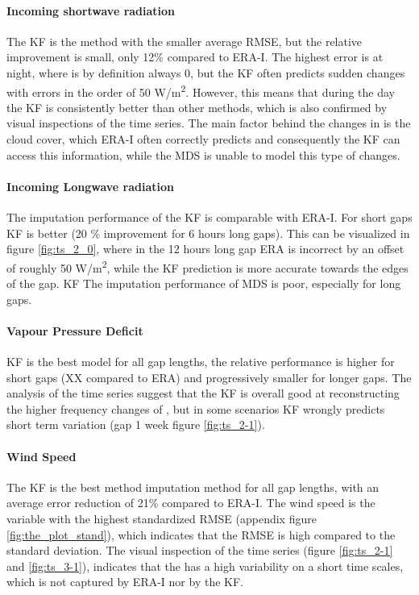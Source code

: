 \documentclass{article}
\begin{document}
\paragraph{Incoming shortwave radiation} The KF is the method with the smaller average RMSE, but the relative improvement is small, only 12\% compared to ERA-I. The highest error is at night, where  is by definition always 0, but the KF often predicts sudden changes with errors in the order of 50 \si{W/m^2}. However, this means that during the day the KF is consistently better than other methods, which is also confirmed by visual inspections of the time series. The main factor behind the changes in  is the cloud cover, which ERA-I often correctly predicts and consequently the KF can access this information, while the MDS is unable to model this type of changes.

\paragraph{Incoming Longwave radiation} The imputation performance of the KF is comparable with ERA-I. For short gaps KF is better (20 \% improvement for 6 hours long gaps). This can be visualized in figure \ref{fig:ts_2_0}, where in the 12 hours long gap ERA is incorrect by an offset of roughly 50 \si{W/m^2}, while the KF prediction is more accurate towards the edges of the gap. KF The imputation performance of MDS is poor, especially for long gaps.

\paragraph{Vapour Pressure Deficit} KF is the best model for all gap lengths, the relative performance is higher for short gaps (XX compared to ERA) and progressively smaller for longer gaps. The analysis of the time series suggest that the KF is overall good at reconstructing the higher frequency changes of , but in some scenarios KF wrongly predicts short term variation (gap 1 week figure \ref{fig:ts_2-1}).

\paragraph{Wind Speed} The KF is the best method imputation method for all gap lengths, with an average error reduction of 21\% compared to ERA-I. The wind speed is the variable with the highest standardized RMSE (appendix figure \ref{fig:the_plot_stand}), which indicates that the RMSE is high compared to the  standard deviation. The visual inspection of the time series (figure \ref{fig:ts_2-1} and \ref{fig:ts_3-1}), indicates that the  has a high variability on a short time scales, which is not captured by ERA-I nor by the KF.
\end{document}
